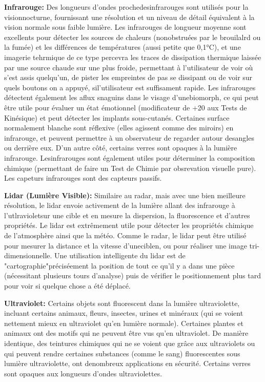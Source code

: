 {{\textbf{Infrarouge:} Des longueurs d'ondes prochedesinfrarouges sont utilisés pour la visionnocturne, fournissant une résolution et un niveau de détail équivalent à la vision normale sous faible lumière. Les infrarouges de longueur moyenne sont excellents pour détecter les sources de chaleurs (nonobstruées par le brouilalrd ou la fumée) et les différences de températures (aussi petite que 0,1°C), et une imagerie tehrmique de ce type percevra les traces de dissipation thermique laissée par une source chaude sur une plus froide, permettant à l'utilisateur de voir où s'est assis quelqu'un, de pister les empreintes de pas se dissipant ou de voir sur quels boutons on a appuyé, sil'utilisateur est suffisament rapide. Les infrarouges détectent également les aflux snaguins dans le visage d'unebiomorph, ce qui peut être utile pour évaluer un état émotionnel (modificateur de +20 aux Tests de Kinésique) et peut détecter les implants sous-cutanés. Certaines surface normalement blanche sont réflexive (elles agissent comme des miroirs) en infrarouge, et peuvent permettre à un observateur de regarder autour desangles ou derrière eux. D'un autre côté, certains verres sont opaques à la lumière infrarouge. Lesinfrarouges sont également utiles pour déterminer la composition chimique (permettant de faire un Test de Chimie par obsrevation visuelle pure). Les capeturs infrarouges sont des capteurs passifs. 

\textbf{Lidar (Lumière Visible):} Similaire au radar, mais avec une bien meilleure résolution, le lidar envoie activement de la lumière allant des infrarouge à l'utlravioletsur une cible et en mesure la dispersion, la fluorescence et d'autres propriétés. Le lidar est extrêmement utile pour détecter les propriétés chimique de l'atmosphère ainsi que la météo. Comme le radar, le lidar peut être utilisé pour mesurer la distance et la vitesse d'uneciblen, ou pour réaliser une image tri-dimensionnelle. Une utilisation intelligente du lidar est de "cartographie"préciséement la position de tout ce qu'il y a dans une pièce (nécessitant plusieurs tours d'analyse) puis de vérifier le positionnement plus tard pour voir si quelque chose a été déplacé. 

\textbf{Ultraviolet:} Certains objets sont fluorescent dans la lumière ultraviolette, incluant certains animaux, fleurs, insectes, urines et minéraux (qui se voient nettement mieux en ultraviolet qu'en lumière normale). Certaines plantes et animaux ont des motifs qui ne peuvent être vus qu'en ultraviolet. De manière identique, des teintures chimiques qui ne se voient que grâce aux ultraviolets ou qui peuvent rendre certaines substances (comme le sang) fluorescentes sous lumière ultraviolette, ont denombreux applications en sécurité. Certains verres sont opaques aux longueurs d'ondes ultraviolettes. 

}}
